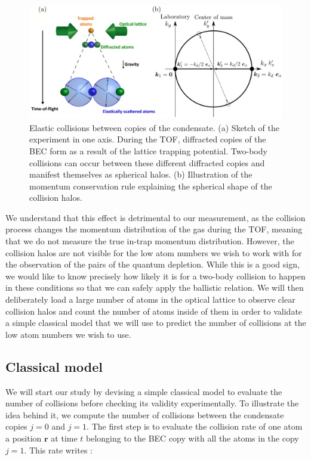 \begin{figure}[ht!]
    \centering
    \includegraphics[width=\textwidth]{Fig/Chapter3/schema_collisions.png}
    \caption[Elastic collisions between copies of the condensate]{Elastic collisions between copies of the condensate. (a) Sketch of the experiment in one axis. During the TOF, diffracted copies of the BEC form as a result of the lattice trapping potential. Two-body collisions can occur between these different diffracted copies and manifest themselves as spherical halos. (b) Illustration of the momentum conservation rule explaining the spherical shape of the collision halos.}
    \label{fig:schema_collisions}
\end{figure}

We understand that this effect is detrimental to our measurement, as the collision process changes the momentum distribution of the gas during the TOF, meaning that we do not measure the true in-trap momentum distribution. However, the collision halos are not visible for the low atom numbers we wish to work with for the observation of the \kmk pairs of the quantum depletion. While this is a good sign, we would like to know precisely how likely it is for a two-body collision to happen in these conditions so that we can safely apply the ballistic relation. We will then deliberately load a large number of atoms in the optical lattice to observe clear collision halos and count the number of atoms inside of them in order to validate a simple classical model that we will use to predict the number of collisions at the low atom numbers we wish to use.

\subsection{Classical model}

We will start our study by devising a simple classical model to evaluate the number of collisions before checking its validity experimentally. To illustrate the idea behind it, we compute the number of collisions between the condensate copies $j=0$ and $j=1$. The first step is to evaluate the collision rate of one atom a position $\bm{r}$ at time $t$ belonging to the BEC copy with all the atoms in the copy $j=1$. This rate writes \cite{chikkatur2000suppression,perrin:tel-00244641}:

